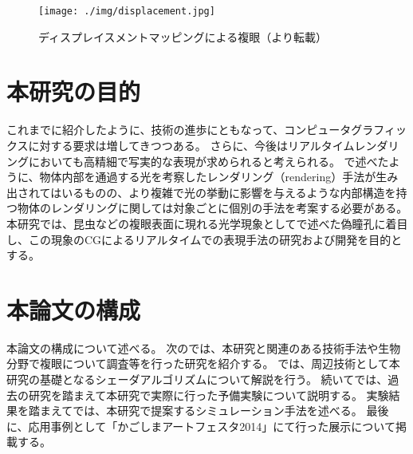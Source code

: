 \begin{figure}[hn]
  \centering
  \texttt{[image: ./img/displacement.jpg]}
  \caption{ディスプレイスメントマッピングによる複眼（\cite{making-of-upside-down}より転載）}
  \label{FDisplacement}
\end{figure}



\section{本研究の目的}
\label{SObjective}

これまでに紹介したように、技術の進歩にともなって、コンピュータグラフィックスに対する要求は増してきつつある。
さらに、今後はリアルタイムレンダリングにおいても高精細で写実的な表現が求められると考えられる。
で述べたように、物体内部を通過する光を考察したレンダリング（rendering）手法が生み出されてはいるものの、より複雑で光の挙動に影響を与えるような内部構造を持つ物体のレンダリングに関しては対象ごとに個別の手法を考案する必要がある。
本研究では、昆虫などの複眼表面に現れる光学現象としてで述べた偽瞳孔に着目し、この現象のCGによるリアルタイムでの表現手法の研究および開発を目的とする。

\section{本論文の構成}
\label{SPaper_structure}

本論文の構成について述べる。
次のでは、本研究と関連のある技術手法や生物分野で複眼について調査等を行った研究を紹介する。
では、周辺技術として本研究の基礎となるシェーダアルゴリズムについて解説を行う。
続いてでは、過去の研究を踏まえて本研究で実際に行った予備実験について説明する。
実験結果を踏まえてでは、本研究で提案するシミュレーション手法を述べる。
最後に、応用事例として「かごしまアートフェスタ2014」にて行った展示について掲載する。
